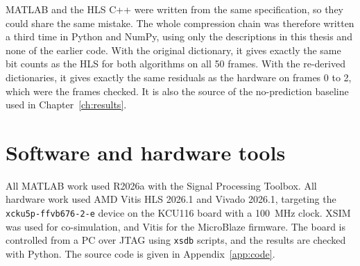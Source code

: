 MATLAB and the HLS C++ were written from the same specification, so they could
share the same mistake. The whole compression chain was therefore written a
third time in Python and NumPy, using only the descriptions in this thesis and
none of the earlier code. With the original dictionary, it gives exactly the
same bit counts as the HLS for both algorithms on all 50 frames. With the
re-derived dictionaries, it gives exactly the same residuals as the hardware on
frames 0 to 2, which were the frames checked. It is also the source of the
no-prediction baseline used in Chapter~\ref{ch:results}.

\section{Software and hardware tools}

All MATLAB work used R2026a with the Signal Processing Toolbox. All hardware
work used AMD Vitis HLS 2026.1 and Vivado 2026.1, targeting the
\texttt{xcku5p-ffvb676-2-e} device on the KCU116 board with a
\SI{100}{\mega\hertz} clock. XSIM was used for co-simulation, and Vitis for the
MicroBlaze firmware. The board is controlled from a PC over JTAG using
\texttt{xsdb} scripts, and the results are checked with Python. The source code
is given in Appendix~\ref{app:code}.
